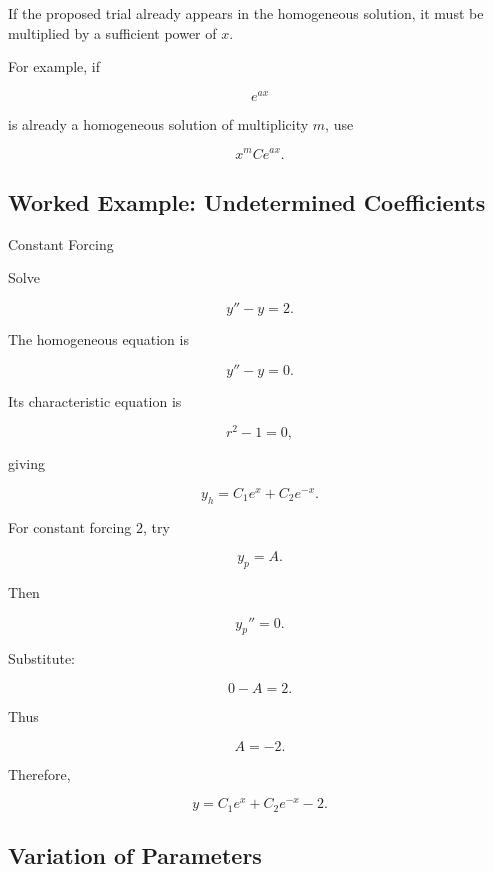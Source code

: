 If the proposed trial already appears in the homogeneous solution, it
must be multiplied by a sufficient power of \(x\).

For example, if

\[
e^{ax}
\]

is already a homogeneous solution of multiplicity \(m\), use

\[
\boxed{
x^mCe^{ax}.
}
\]

\subsection{Worked Example: Undetermined Coefficients}
\label{subsec:worked-undetermined-coefficients}

\begin{workedexamplebox}{Constant Forcing}

Solve

\[
y''-y=2.
\]

The homogeneous equation is

\[
y''-y=0.
\]

Its characteristic equation is

\[
r^2-1=0,
\]

giving

\[
y_h
=
C_1e^x
+
C_2e^{-x}.
\]

For constant forcing \(2\), try

\[
y_p=A.
\]

Then

\[
y_p''=0.
\]

Substitute:

\[
0-A=2.
\]

Thus

\[
A=-2.
\]

Therefore,

\begin{answerbox}
\[
\boxed{
y
=
C_1e^x
+
C_2e^{-x}
-
2.
}
\]
\end{answerbox}

\end{workedexamplebox}

\subsection{Variation of Parameters}
\label{subsec:variation-of-parameters}

